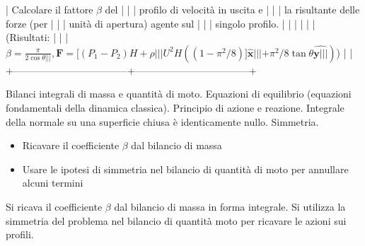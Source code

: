 \documentclass[letterpaper,10pt,italian]{jupyterBook}
\begin{document}
| Calcolare il fattore \(\beta\) del  |                                   |
| profilo di velocità in uscita e   |                                   |
| la risultante delle forze (per    |                                   |
| unità di apertura) agente sul     |                                   |
| singolo profilo.                  |                                   |
|                                   |                                   |
| (Risultati:                       |                                   |
| \(\beta = \frac{\pi}{2 \cos \theta |                                   |
| }, \bm{F} = [(P_1 - P_2) H + \rho |                                   |
|  U^2 H ((1-\pi^2/8) ]\bm{\hat{x}} |                                   |
|  + \pi^2/8 \tan \theta \bm{\hat{y |                                   |
| }})\))                             |                                   |
+———————————–+———————————–+

\sphinxAtStartPar
Bilanci integrali di massa e quantità di moto. Equazioni di equilibrio
(equazioni fondamentali della dinamica classica). Principio di azione e
reazione. Integrale della normale su una superficie chiusa è
identicamente nullo. Simmetria.
\begin{itemize}
\item {} 
\sphinxAtStartPar
Ricavare il coefficiente \(\beta\) dal bilancio di massa

\item {} 
\sphinxAtStartPar
Usare le ipotesi di simmetria nel bilancio di quantità di moto per
annullare alcuni termini

\end{itemize}

\sphinxAtStartPar
Si ricava il coefficiente \(\beta\) dal bilancio di massa in forma
integrale. Si utilizza la simmetria del problema nel bilancio di
quantità moto per ricavare le azioni sui profili.

\sphinxstepscope
\end{document}

